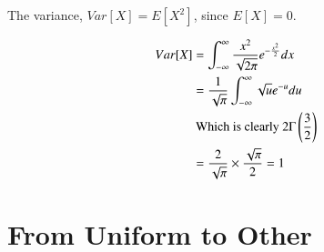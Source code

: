 \documentclass[journal,12pt,twocolumn]{IEEEtran}
\renewcommand\thesection{\arabic{section}}
\providecommand{\brak}[1]{\ensuremath{\left(#1\right)}}
\theoremstyle{remark}
\numberwithin{equation}{section}
\numberwithin{equation}{section}
\begin{document}
\begin{enumerate}[label=\thesection.\arabic*,ref=\thesection.\theenumi]
The variance, $Var[X] = E[X^2]$, since $E[X] = 0$.

\begin{align}
    Var[X] &= \int_{-\infty}^\infty \frac{x^2}{\sqrt{2 \pi}} \e{-\frac{x^2}{2}} dx \nonumber \\
    &= \inv{\sqrt{\pi}} \int_{-\infty}^\infty \sqrt{u} \e{-u} du \\
    &\text{ Which is clearly } 2 \Gamma\brak{\frac{3}{2}} \nonumber \\
    &= \frac{2}{\sqrt{\pi}} \times \frac{\sqrt{\pi}}{2} = 1
\end{align}



\end{enumerate}
\newpage

\section{From Uniform to Other}
\end{document}
